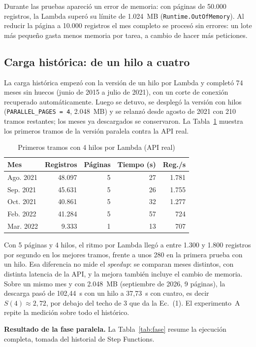 \documentclass[conference]{IEEEtran}
\begin{document}
Durante las pruebas apareció un error de memoria: con páginas de 50.000 registros, la Lambda superó su límite de 1.024~MB (\texttt{Runtime.OutOfMemory}). Al reducir la página a 10.000 registros el mes completo se procesó sin errores: un lote más pequeño gasta menos memoria por tarea, a cambio de hacer más peticiones.

\subsection{Carga histórica: de un hilo a cuatro}
La carga histórica empezó con la versión de un hilo por Lambda y completó 74 meses sin huecos (junio de 2015 a julio de 2021), con un corte de conexión recuperado automáticamente. Luego se detuvo, se desplegó la versión con hilos (\texttt{PARALLEL\_PAGES = 4}, 2.048~MB) y se relanzó desde agosto de 2021 con 210 tramos restantes; los meses ya descargados se conservaron. La Tabla~\ref{tab:paralelo} muestra los primeros tramos de la versión paralela contra la API real.

\begin{table}[htbp]
\caption{Primeros tramos con 4 hilos por Lambda (API real)}
\label{tab:paralelo}
\centering
\begin{tabular}{@{}lrrrr@{}}
\toprule
Mes & Registros & Páginas & Tiempo (s) & Reg./s \\
\midrule
Ago. 2021 & 48.097 & 5 & 27 & 1.781 \\
Sep. 2021 & 45.631 & 5 & 26 & 1.755 \\
Oct. 2021 & 40.861 & 5 & 32 & 1.277 \\
Feb. 2022 & 41.284 & 5 & 57 & 724 \\
Mar. 2022 & 9.333 & 1 & 13 & 707 \\
\bottomrule
\end{tabular}
\end{table}

Con 5 páginas y 4 hilos, el ritmo por Lambda llegó a entre 1.300 y 1.800 registros por segundo en los mejores tramos, frente a unos 280 en la primera prueba con un hilo. Esa diferencia no mide el \textit{speedup}: se comparan meses distintos, con distinta latencia de la API, y la mejora también incluye el cambio de memoria. Sobre un mismo mes y con 2.048~MB (septiembre de 2026, 9 páginas), la descarga pasó de 102,44~s con un hilo a 37,73~s con cuatro, es decir $S(4) \approx 2{,}72$, por debajo del techo de 3 que da la Ec.~(1). El experimento~A repite la medición sobre todo el histórico.

\textbf{Resultado de la fase paralela.} La Tabla~\ref{tab:fase} resume la ejecución completa, tomada del historial de Step Functions.
\end{document}
